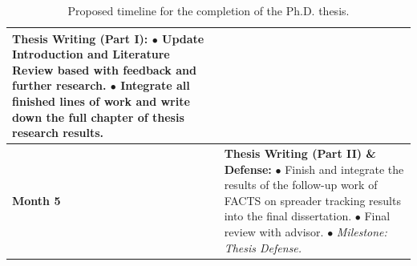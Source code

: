 \begin{table}[H]
\begin{tabular}{|p{}|p{}|}
        \textbf{Thesis Writing (Part I):} \newline
        $\bullet$ Update Introduction and Literature Review based with feedback and further research. \newline
        $\bullet$ Integrate all finished lines of work and write down the full chapter of thesis research results. \\
        \hline
        \textbf{Month 5} & 
        \textbf{Thesis Writing (Part II) \& Defense:} \newline
        $\bullet$ Finish and integrate the results of the follow-up work of FACTS on spreader tracking results into the final dissertation. \newline
        $\bullet$ Final review with advisor. \newline
        $\bullet$ \textit{Milestone: Thesis Defense.} \\
        \hline
    \end{tabular}
    \caption{Proposed timeline for the completion of the Ph.D. thesis.}
    \label{tab:timeline}
\end{table}